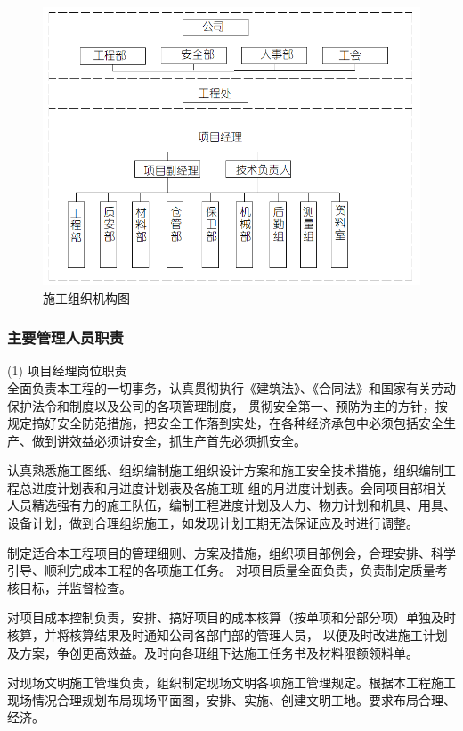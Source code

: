 \begin{figure}[thbp!]
    \centering
    \includegraphics[width=0.8\linewidth]{figure/c2f1.png}
    \caption{施工组织机构图}
    \label{fig:c2f1}
\end{figure}

\subsubsection{主要管理人员职责}

(1) 项目经理岗位职责\\

 全面负责本工程的一切事务，认真贯彻执行《建筑法》、《合同法》和国家有关劳动保护法令和制度以及公司的各项管理制度，
贯彻安全第一、预防为主的方针，按规定搞好安全防范措施，把安全工作落到实处，在各种经济承包中必须包括安全生产、做到讲效益必须讲安全，抓生产首先必须抓安全。

 认真熟悉施工图纸、组织编制施工组织设计方案和施工安全技术措施，组织编制工程总进度计划表和月进度计划表及各施工班
组的月进度计划表。会同项目部相关人员精选强有力的施工队伍，编制工程进度计划及人力、物力计划和机具、用具、设备计划，做到合理组织施工，如发现计划工期无法保证应及时进行调整。

 制定适合本工程项目的管理细则、方案及措施，组织项目部例会，合理安排、科学引导、顺利完成本工程的各项施工任务。
对项目质量全面负责，负责制定质量考核目标，并监督检查。

 对项目成本控制负责，安排、搞好项目的成本核算（按单项和分部分项）单独及时核算，并将核算结果及时通知公司各部门部的管理人员，
以便及时改进施工计划及方案，争创更高效益。及时向各班组下达施工任务书及材料限额领料单。

 对现场文明施工管理负责，组织制定现场文明各项施工管理规定。根据本工程施工现场情况合理规划布局现场平面图，安排、实施、创建文明工地。要求布局合理、经济。

